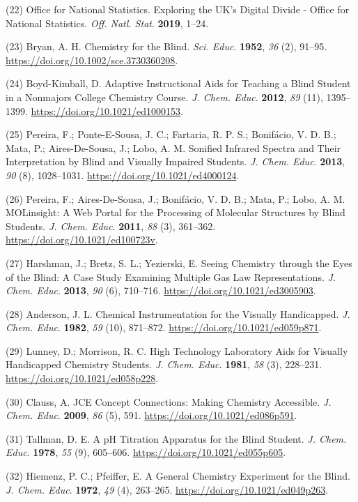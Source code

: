 \documentclass[11.5pt]{sig-alternate} %
\begin{document}
(22)	Office for National Statistics. Exploring the UK’s Digital Divide - Office for National Statistics. \textit{Off. Natl. Stat}. \textbf{2019}, 1–24.

(23)	Bryan, A. H. Chemistry for the Blind. \textit{Sci. Educ}. \textbf{1952}, \textit{36} (2), 91–95. \url{https://doi.org/10.1002/sce.3730360208}.

(24)	Boyd-Kimball, D. Adaptive Instructional Aids for Teaching a Blind Student in a Nonmajors College Chemistry Course. \textit{J. Chem. Educ}. \textbf{2012}, \textit{89} (11), 1395–1399. \url{https://doi.org/10.1021/ed1000153}.

(25)	Pereira, F.; Ponte-E-Sousa, J. C.; Fartaria, R. P. S.; Bonifácio, V. D. B.; Mata, P.; Aires-De-Sousa, J.; Lobo, A. M. Sonified Infrared Spectra and Their Interpretation by Blind and Visually Impaired Students. \textit{J. Chem. Educ}. \textbf{2013}, \textit{90} (8), 1028–1031. \url{https://doi.org/10.1021/ed4000124}.

(26)	Pereira, F.; Aires-De-Sousa, J.; Bonifácio, V. D. B.; Mata, P.; Lobo, A. M. MOLinsight: A Web Portal for the Processing of Molecular Structures by Blind Students. \textit{J. Chem. Educ}. \textbf{2011}, \textit{88} (3), 361–362. \url{https://doi.org/10.1021/ed100723v}.

(27)	Harshman, J.; Bretz, S. L.; Yezierski, E. Seeing Chemistry through the Eyes of the Blind: A Case Study Examining Multiple Gas Law Representations. \textit{J. Chem. Educ}. \textbf{2013}, \textit{90} (6), 710–716. \url{https://doi.org/10.1021/ed3005903}.

(28)	Anderson, J. L. Chemical Instrumentation for the Visually Handicapped. \textit{J. Chem. Educ}. \textbf{1982}, \textit{59} (10), 871–872. \url{https://doi.org/10.1021/ed059p871}.

(29)	Lunney, D.; Morrison, R. C. High Technology Laboratory Aids for Visually Handicapped Chemistry Students. \textit{J. Chem. Educ}. \textbf{1981}, \textit{58} (3), 228–231. \url{https://doi.org/10.1021/ed058p228}.

(30)	Clauss, A. JCE Concept Connections: Making Chemistry Accessible. \textit{J. Chem. Educ}. \textbf{2009}, \textit{86} (5), 591. \url{https://doi.org/10.1021/ed086p591}.

(31)	Tallman, D. E. A pH Titration Apparatus for the Blind Student. \textit{J. Chem. Educ}. \textbf{1978}, \textit{55} (9), 605–606. \url{https://doi.org/10.1021/ed055p605}.

(32)	Hiemenz, P. C.; Pfeiffer, E. A General Chemistry Experiment for the Blind. \textit{J. Chem. Educ}. \textbf{1972}, \textit{49} (4), 263–265. \url{https://doi.org/10.1021/ed049p263}.
\end{document}
